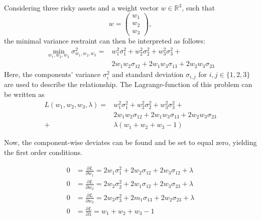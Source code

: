 Considering three risky assets and a weight vector $w \in \mathbb{R}^{3}$, such that 
\begin{equation}
  w = \begin{pmatrix}w_1\\w_2\\w_3\end{pmatrix},
\end{equation}
the minimal variance restraint can then be interpreted as follows\cite[p.~7]{ZIV13}:
\begin{equation} \label{eq:4}
  \begin{split}
    \min_{w_1, w_2, w_3} \sigma^2_{w_1, w_2, w_3} = & w^2_1 \sigma^2_1 + w^2_2 \sigma^2_2 + w^2_3 \sigma^2_3 + \\ & 2w_1w_2 \sigma_{12} + 2w_1w_3\sigma_{13} + 2w_2w_3\sigma_{23}
  \end{split}
\end{equation}
Here, the components' variance $\sigma^2_{i}$ and standard deviation $\sigma_{i,j}$ for $i,j \in \lbrace 1, 2, 3 \rbrace$ are used to describe the relationship. The Lagrange-function of this problem can be written as 
\begin{equation} \label{eq:5}
  \begin{split}
    L(w_1, w_2, w_3, \lambda) = & w^2_1 \sigma^2_1 + w^2_2 \sigma^2_2 + w^2_3 \sigma^2_3 + \\ & 2w_1w_2 \sigma_{12} + 2w_1w_3\sigma_{13} + 2w_2w_3\sigma_{23} \\
    + & \lambda(w_1 + w_2 + w_3 - 1)
  \end{split}
\end{equation}

Now, the component-wise deviates can be found and be set to equal zero, yielding the first order conditions.

\begin{equation} \label{eq:6}
  \begin{split}
    0 &= \frac{\partial L}{\partial w_1} = 2 w_1 \sigma^2_1 + 2 w_2 \sigma_{12} + 2 w_3 \sigma_{12} + \lambda \\
    0 &= \frac{\partial L}{\partial w_2} = 2 w_2 \sigma^2_2 + 2 w_1 \sigma_{12} + 2 w_3 \sigma_{23} + \lambda \\
    0 &= \frac{\partial L}{\partial w_3} = 2 w_3 \sigma^2_3 + 2 m_1 \sigma_{13} + 2 w_2 \sigma_{23} + \lambda \\
    0 &= \frac{\partial L}{\partial \lambda} = w_1 + w_2 + w_3 - 1
  \end{split}
\end{equation}

